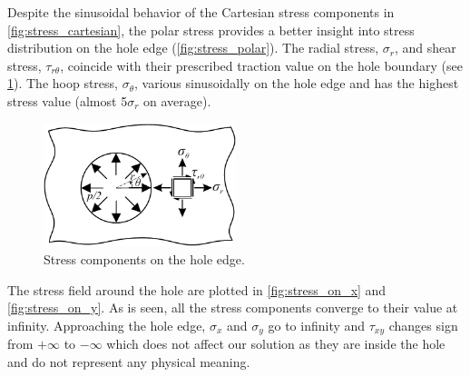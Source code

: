 \documentclass{article}
\begin{document}
Despite the sinusoidal behavior of the Cartesian stress components in \cref{fig:stress_cartesian}, the polar stress provides a better insight into stress distribution on the hole edge (\cref{fig:stress_polar}). The radial stress, $\sigma_r$, and shear stress, $\tau_{r\theta}$, coincide with their prescribed traction value on the hole boundary (see \cref{fig:traction_element}). The hoop stress, $\sigma_{\theta}$, various sinusoidally on the hole edge and has the highest stress value (almost 5$\sigma_r$ on average).

\begin{figure}[ht]
    \centering
    \includegraphics[width = 0.5\textwidth ]{figures/traction_element.pdf}
    \caption{Stress components on the hole edge.}
    \label{fig:traction_element}
\end{figure}

The stress field around the hole are plotted in \cref{fig:stress_on_x} and \cref{fig:stress_on_y}. As is seen, all the stress components converge to their value at infinity. Approaching the hole edge, $\sigma_x$ and $\sigma_y$ go to infinity and $\tau_{xy}$ changes sign from $+\infty$ to $-\infty$ which does not affect our solution as they are inside the hole and do not represent any physical meaning. \\
\end{document}
